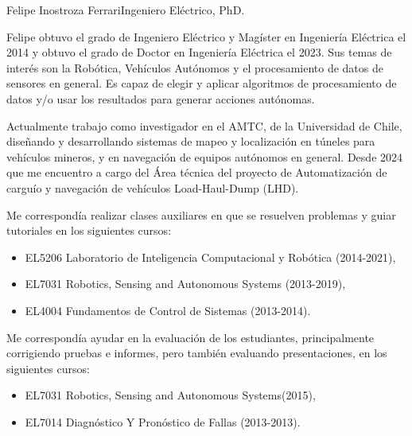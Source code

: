 \documentclass{article}
\begin{document}
\begin{cv}[avatar]{Felipe Inostroza Ferrari}{Ingeniero Eléctrico, PhD.}



	Felipe obtuvo el grado de Ingeniero Eléctrico y Magíster en Ingeniería Eléctrica el 2014 y obtuvo el grado de Doctor en Ingeniería Eléctrica el 2023. Sus temas de interés son la Robótica, Vehículos Autónomos y el procesamiento de datos de sensores en general. Es capaz de elegir y aplicar algoritmos de procesamiento de datos y/o usar los resultados para generar acciones autónomas.


	\begin{cvevent}[2020][presente]
		Actualmente trabajo como investigador en el AMTC, de la Universidad de Chile, diseñando y desarrollando sistemas de mapeo y localización en túneles para vehículos mineros, y en navegación de equipos autónomos en general. Desde 2024 que me encuentro a cargo del Área técnica del proyecto de Automatización de carguío y navegación de vehículos Load-Haul-Dump (LHD).
	\end{cvevent}

	\begin{cvevent}[2014][2021]
		Me correspondía realizar clases auxiliares en que se resuelven problemas y guiar tutoriales en los siguientes cursos:
		\begin{itemize}
			\item EL5206 Laboratorio de Inteligencia Computacional y Robótica (2014-2021),
			\item EL7031 Robotics, Sensing and Autonomous Systems (2013-2019),
			\item EL4004 Fundamentos de Control de Sistemas (2013-2014).
		\end{itemize}
	\end{cvevent}

	\begin{cvevent}[2013,2015]
		Me correspondía ayudar en la evaluación de los estudiantes, principalmente corrigiendo pruebas e informes, pero también evaluando presentaciones, en los siguientes cursos:
		\begin{itemize}
			\item EL7031 Robotics, Sensing and Autonomous Systems(2015),
			\item EL7014 Diagnóstico Y Pronóstico de Fallas (2013-2013).
		\end{itemize}
	\end{cvevent}


\end{cv}
\end{document}
